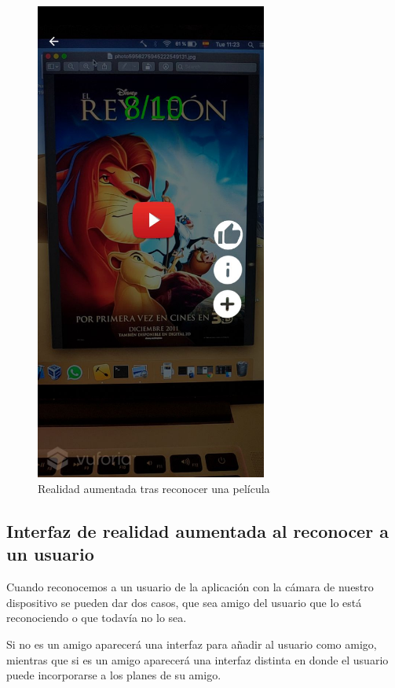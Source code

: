 \begin{figure}[H]
    \centering
    \includegraphics[width=3in]{figures/filmrecognized2.jpg}
    \caption{Realidad aumentada tras reconocer una película}
\end{figure}

\newpage
\subsection{Interfaz de realidad aumentada al reconocer a un usuario}
\label{makereference3.4.5}
\begin{flushleft}
Cuando reconocemos a un usuario de la aplicación con la cámara de nuestro dispositivo se pueden dar dos casos,
 que sea amigo del usuario que lo está reconociendo o que todavía no lo sea.
\end{flushleft}
\begin{flushleft}
Si no es un amigo aparecerá una interfaz para añadir al usuario como amigo, mientras que si es un amigo 
aparecerá una interfaz distinta en donde el usuario puede incorporarse a los planes de su amigo.
\end{flushleft}
